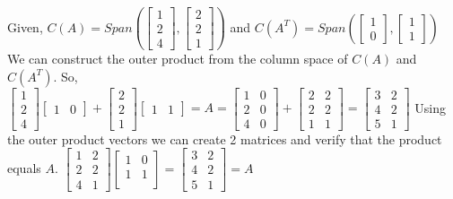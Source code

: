 	Given, $C(A)=Span \left( 
	\begin{bmatrix}
	1 \\ 2 \\ 4
	\end{bmatrix}
	,
	\begin{bmatrix}
	2 \\ 2 \\ 1
	\end{bmatrix}
	\right)$
	and 
	$C(A^T)=Span \left( 
	\begin{bmatrix}
	1 \\ 0
	\end{bmatrix}
	,
	\begin{bmatrix}
	1 \\ 1
	\end{bmatrix}
	\right)$
	We can construct the outer product from the column space of $C(A)$ and $C(A^T)$. So,
	\newline
	$
	\begin{bmatrix}
	1 \\ 2 \\ 4
	\end{bmatrix}
	\begin{bmatrix}
	1 & 0
	\end{bmatrix}
	+
	\begin{bmatrix}
	2 \\ 2 \\ 1
	\end{bmatrix}
	\begin{bmatrix}
	1 & 1
	\end{bmatrix}
	=A=
	\begin{bmatrix}
	1 & 0 \\
	2 & 0 \\
	4 & 0
	\end{bmatrix}
	+
	\begin{bmatrix}
	2 & 2 \\
	2 & 2 \\
	1 & 1
	\end{bmatrix}
	=
	\begin{bmatrix}
	3 & 2 \\
	4 & 2 \\
	5 & 1
	\end{bmatrix}
	$
	\newline
	Using the outer product vectors we can create 2 matrices and verify that the product equals $A$.
	$
	\begin{bmatrix}
	1 & 2 \\
	2 & 2 \\
	4 & 1
	\end{bmatrix}
	\begin{bmatrix}
	1 & 0 \\
	1 & 1 \\
	\end{bmatrix}
	=
	\begin{bmatrix}
	3 & 2 \\
	4 & 2 \\
	5 & 1
	\end{bmatrix}
	=A
	$